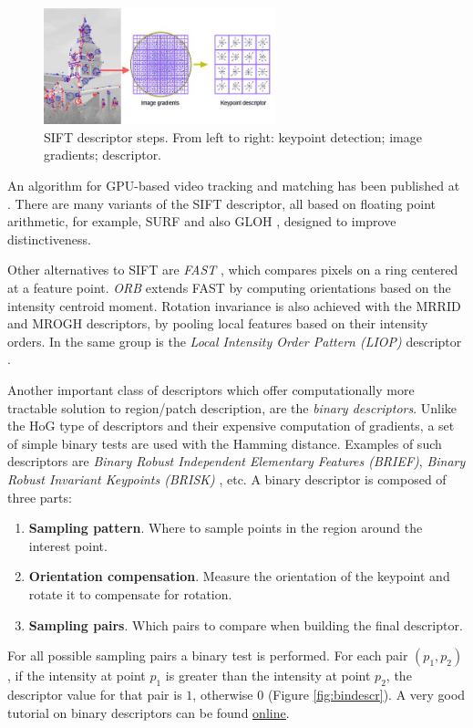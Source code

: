 \begin{figure}[H]
\begin{center}
\includegraphics[width=0.6\textwidth]{fig/SIFT}
\end{center}
\caption{SIFT descriptor steps. From left to right: keypoint detection; image gradients; descriptor.}
\label{fig:sift}
\end{figure}

An algorithm for GPU-based video tracking and matching has been published at \cite{Sinha06gpu-basedvideo}. There are many variants of the SIFT descriptor, all based on floating point arithmetic, for example, SURF\cite{Bay:2008:SURF} and also GLOH \cite{MS05}, designed to improve distinctiveness.  

Other alternatives to SIFT are {\em FAST} \cite{Rosten:2006}, which compares pixels on a ring centered at a feature point. {\em  ORB} \cite{Rublee:2011} extends FAST by computing orientations based on the intensity centroid moment. Rotation invariance is also achieved with the MRRID and MROGH descriptors, \cite{journals:pami:FanWH12} by pooling local features based on their intensity orders. In the same group is the {\em Local Intensity Order Pattern (LIOP)} descriptor \cite{ZhenhuaWang:2011:LIO}. 

Another important class of descriptors which offer computationally more tractable solution to region/patch description, are the {\em binary descriptors}. Unlike the HoG type of descriptors and their expensive computation of gradients, a set of simple binary tests are used with the Hamming distance. Examples of such descriptors are {\em Binary Robust Independent Elementary Features (BRIEF)}\cite{Calonder:2010}, {\em Binary Robust Invariant Keypoints (BRISK)} \cite{Leutenegger:2011}, etc. A binary descriptor is composed of three parts:
\begin{enumerate}
\item{\bf Sampling pattern}. Where to sample points in the region around the interest point.
\item{\bf Orientation compensation}. Measure the orientation of the keypoint and rotate it to compensate for rotation.
\item{\bf Sampling pairs}. Which pairs to compare when building the final descriptor.
\end{enumerate}
For all possible sampling pairs a binary test is performed. For each pair $(p_1, p_2)$, if the intensity at point $p_1$ is greater than the intensity at point $p_2$, the descriptor value for that pair is $1$, otherwise $0$ (Figure \ref{fig:bindescr}). A very good tutorial on binary descriptors can be found \href{https://gilscvblog.wordpress.com/?s=descriptors}{\underline{online}}. 

